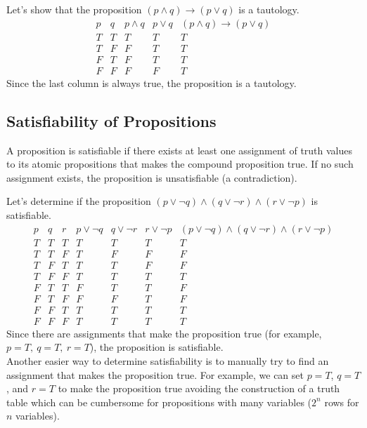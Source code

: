 \begin{eg}
    Let's show that the proposition $(p \land q) \to (p \lor q)$ is a tautology.
    \[
        \begin{array}{c|c|c|c|c}
            p & q & p \land q & p \lor q & (p \land q) \to (p \lor q) \\
            \hline
            T & T & T & T & T \\
            T & F & F & T & T \\
            F & T & F & T & T \\
            F & F & F & F & T
        \end{array}
    \]
    Since the last column is always true, the proposition is a tautology.
\end{eg}

\subsection{Satisfiability of Propositions}
\begin{definition}
    A proposition is satisfiable if there exists at least one assignment of truth values to its atomic propositions that makes the compound proposition true. If no such assignment exists, the proposition is unsatisfiable (a contradiction).
\end{definition}

\begin{eg}
    Let's determine if the proposition $(p \lor  \neg q) \land (q \lor \neg r) \land (r \lor \neg p)$ is satisfiable.
    \[
        \begin{array}{c|c|c|c|c|c|c}
            p & q & r & p \lor \neg q & q \lor \neg r & r \lor \neg p & (p \lor  \neg q) \land (q \lor \neg r) \land (r \lor \neg p) \\
            \hline
            T & T & T & T & T & T & T \\
            T & T & F & T & F & F & F \\
            T & F & T & T & T & F & F \\
            T & F & F & T & T & T & T \\
            F & T & T & F & T & T & F \\
            F & T & F & F & F & T & F \\
            F & F & T & T & T & T & T \\
            F & F & F & T & T & T & T
        \end{array}
    \]
    Since there are assignments that make the proposition true (for example, \(p = T, \ q = T, \ r = T\)), the proposition is satisfiable.
    $$$$
    Another easier way to determine satisfiability is to manually try to find an assignment that makes the proposition true. For example, we can set \(p = T\), \(q = T\), and \(r = T\) to make the proposition true avoiding the construction of a truth table which can be cumbersome for propositions with many variables ($2^n$ rows for \(n\) variables).
\end{eg}

